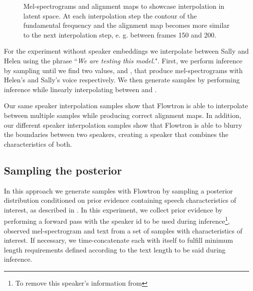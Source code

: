 \documentclass{article}
\begin{document}
\begin{figure}[!ht]
    \centering
    
    
    
    
    \caption{Mel-spectrograms and alignment maps to showcase interpolation in latent space. At each interpolation step the contour of the fundamental frequency and the alignment map becomes more similar to the next interpolation step, e. g. between frames 150 and 200.}
    \label{fig:interpolation}
\end{figure}
\fi

For the experiment without speaker embeddings we interpolate between Sally and Helen using the phrase ``\textit{We are testing this model.}". First, we perform inference by sampling  until we find two  values,  and , that produce mel-spectrograms with Helen's and Sally's voice respectively. We then generate samples by performing inference while linearly interpolating between  and . 

Our same speaker interpolation samples show that Flowtron is able to interpolate between multiple samples while producing correct alignment maps. In addition, our different speaker interpolation samples show that Flowtron is able to blurry the boundaries between two speakers, creating a speaker that combines the characteristics of both. \subsection{Sampling the posterior}\label{sec:sampling_posterior}
In this approach we generate samples with Flowtron by sampling a posterior distribution conditioned on prior evidence containing speech characteristics of interest, as described in \cite{gambardella2019transflow,kingma2018glow}. In this experiment, we collect prior evidence  by performing a forward pass with the speaker id to be used during inference\footnote{To remove this speaker's information from }, observed mel-spectrogram and text from a set of samples with characteristics of interest. If necessary, we time-concatenate each  with itself to fulfill minimum length requirements defined according to the text length to be said during inference. 
\end{document}
